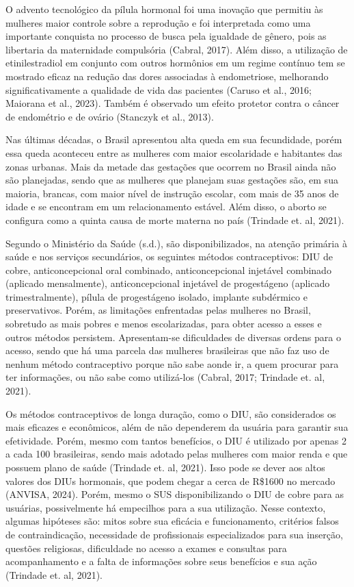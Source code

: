 O advento tecnológico da pílula hormonal foi uma inovação que permitiu às mulheres maior controle sobre a reprodução e foi interpretada como uma importante conquista no processo de busca pela igualdade de gênero, pois as libertaria da maternidade compulsória (Cabral, 2017). Além disso, a utilização de etinilestradiol em conjunto com outros hormônios em um regime contínuo tem se mostrado eficaz na redução das dores associadas à endometriose, melhorando significativamente a qualidade de vida das pacientes (Caruso et al., 2016; Maiorana et al., 2023). Também é observado um efeito protetor contra o câncer de endométrio e de ovário (Stanczyk et al., 2013).

Nas últimas décadas, o Brasil apresentou alta queda em sua fecundidade, porém essa queda aconteceu entre as mulheres com maior escolaridade e habitantes das zonas urbanas. Mais da metade das gestações que ocorrem no Brasil ainda não são planejadas, sendo que as mulheres que planejam suas gestações são, em sua maioria, brancas, com maior nível de instrução escolar, com mais de 35 anos de idade e se encontram em um relacionamento estável. Além disso, o aborto se configura como a quinta causa de morte materna no país (Trindade et. al, 2021).

Segundo o Ministério da Saúde (s.d.), são disponibilizados, na atenção primária à saúde e nos serviços secundários, os seguintes métodos contraceptivos: DIU de cobre, anticoncepcional oral combinado, anticoncepcional injetável combinado (aplicado mensalmente), anticoncepcional injetável de progestágeno (aplicado trimestralmente), pílula de progestágeno isolado, implante subdérmico e preservativos. Porém, as limitações enfrentadas pelas mulheres no Brasil, sobretudo as mais pobres e menos escolarizadas, para obter acesso a esses e outros métodos persistem. Apresentam-se dificuldades de diversas ordens para o acesso, sendo que há uma parcela das mulheres brasileiras que não faz uso de nenhum método contraceptivo porque não sabe aonde ir, a quem procurar para ter informações, ou não sabe como utilizá-los (Cabral, 2017; Trindade et. al, 2021).

Os métodos contraceptivos de longa duração, como o DIU, são considerados os mais eficazes e econômicos, além de não dependerem da usuária para garantir sua efetividade. Porém, mesmo com tantos benefícios, o DIU é utilizado por apenas 2 a cada 100 brasileiras, sendo mais adotado pelas mulheres com maior renda e que possuem plano de saúde (Trindade et. al, 2021). Isso pode se dever aos altos valores dos DIUs hormonais, que podem chegar a cerca de R\$1600 no mercado (ANVISA, 2024). Porém, mesmo o SUS disponibilizando o DIU de cobre para as usuárias, possivelmente há empecilhos para a sua utilização. Nesse contexto, algumas hipóteses são: mitos sobre sua eficácia e funcionamento, critérios falsos de contraindicação, necessidade de profissionais especializados para sua inserção, questões religiosas, dificuldade no acesso a exames e consultas para acompanhamento e a falta de informações sobre seus benefícios e sua ação (Trindade et. al, 2021).

